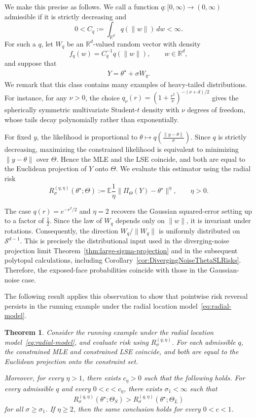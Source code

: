 \documentclass[11pt]{article}
\theoremstyle{plain}
\newtheorem{theorem}{Theorem}[section]
\theoremstyle{definition}
\providecommand{\mathbbm}{\mathbb} %
\newcommand{\R}{\mathbbm{R}}
\newcommand{\E}{\mathbb{E}}
\newcommand{\mcS}{\mathcal{S}}
\begin{document}
We make this precise as follows. We call a function $q:[0,\infty)\to(0,\infty)$ admissible if it is strictly decreasing and 
\[
    0<C_q:=\int_{\R^d} q(\|w\|)\,dw<\infty .
\]
For such a $q$, let $W_q$ be an $\R^d$-valued random vector with density
\[
    f_q(w)
    =
    C_q^{-1}q(\|w\|),
    \qquad w\in\R^d,
\]
and suppose that
\begin{align}
\label{eq:radial-model}
    Y=\theta^\star+\sigma W_q.
\end{align}
We remark that this class contains many examples of heavy-tailed distributions. For instance, for any $\nu>0$, the choice $q_\nu(r) = (1+\frac{r^2}{\nu})^{-(\nu+d)/2}$ gives the spherically symmetric multivariate Student-$t$ density with $\nu$ degrees of freedom, whose tails decay polynomially rather than exponentially.

For fixed $y$, the likelihood is proportional to $\theta
    \mapsto
    q\left(\frac{\|y-\theta\|}{\sigma}\right)$. Since $q$ is strictly decreasing, maximizing the constrained likelihood is
equivalent to minimizing $\|y-\theta\|$ over $\Theta$. Hence the MLE and the
LSE coincide, and both are equal to the Euclidean projection of $Y$ onto
$\Theta$. We evaluate this estimator using the radial risk
\[
    R_{\sigma}^{(q,\eta)}(\theta^\star;\Theta)
    :=
    \E \frac{1}{\eta}
    \|
        \Pi_{\Theta}(Y)-\theta^\star
    \|^\eta,
    \qquad
    \eta>0.
\]

The case $q(r) = e^{-r^2/2}$ and $\eta=2$ recovers the Gaussian squared-error setting up to a factor of $\frac{1}{2}$. Since the law of $W_q$ depends only on $\|w\|$, it is invariant under
rotations. Consequently, the direction $W_q/\|W_q\|$ is uniformly distributed
on $\mcS^{d-1}$. This is precisely the distributional
input used in the diverging-noise projection limit
Theorem~\ref{thm:large-sigma-projection} and in the subsequent polytopal calculations, including Corollary~\ref{cor:DivergingNoiseThetaSLRisks}. Therefore, the exposed-face probabilities coincide with those in the Gaussian-noise case.

The following result applies this observation to show that
pointwise risk reversal persists in the running example under the
radial location model~\eqref{eq:radial-model}. 

\begin{theorem}
\label{thm:radial-beta-eta}
Consider the running example under the radial
location model~\eqref{eq:radial-model}, and evaluate risk using
$R_{\sigma}^{(q,\eta)}$. For each admissible $q$, the
constrained MLE and constrained LSE coincide, and both are equal to the
Euclidean projection onto the constraint set.

Moreover, for every $\eta>1$, there exists $c_\eta>0$ such that the
following holds. For every admissible $q$ and every
$0<c<c_\eta$, there exists $\sigma_1<\infty$ such that
\[
R_{\sigma}^{(q,\eta)}(\theta^\star;\Theta_S)
>
R_{\sigma}^{(q,\eta)}(\theta^\star;\Theta_L)
\]
for all $\sigma\ge\sigma_1$. If $\eta\ge2$, then the same conclusion holds
for every $0<c<1$.
\end{theorem}
\end{document}
